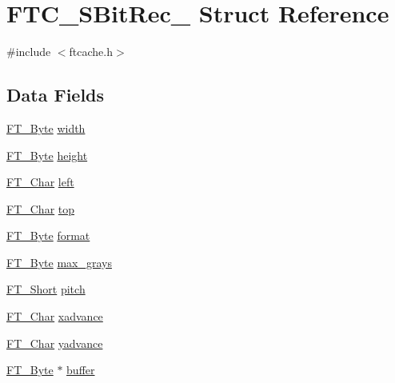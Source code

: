 \hypertarget{struct_f_t_c___s_bit_rec__}{}\section{F\+T\+C\+\_\+\+S\+Bit\+Rec\+\_\+ Struct Reference}
\label{struct_f_t_c___s_bit_rec__}


{\ttfamily \#include $<$ftcache.\+h$>$}

\subsection*{Data Fields}
\begin{DoxyCompactItemize}
\item 
\hyperlink{fttypes_8h_a51f26183ca0c9f4af958939648caeccd}{F\+T\+\_\+\+Byte} \hyperlink{struct_f_t_c___s_bit_rec___a5b92fb4f213a880f758bb87ac2ceb263}{width}
\item 
\hyperlink{fttypes_8h_a51f26183ca0c9f4af958939648caeccd}{F\+T\+\_\+\+Byte} \hyperlink{struct_f_t_c___s_bit_rec___a5953efe2aded3b184875d5e5d08cafef}{height}
\item 
\hyperlink{fttypes_8h_a0f851552b050883885f0a0855771f39d}{F\+T\+\_\+\+Char} \hyperlink{struct_f_t_c___s_bit_rec___aef273749f4fdb9943500ec6df8412a94}{left}
\item 
\hyperlink{fttypes_8h_a0f851552b050883885f0a0855771f39d}{F\+T\+\_\+\+Char} \hyperlink{struct_f_t_c___s_bit_rec___a3e558b3a04b70f00f80b862cdc94d9a2}{top}
\item 
\hyperlink{fttypes_8h_a51f26183ca0c9f4af958939648caeccd}{F\+T\+\_\+\+Byte} \hyperlink{struct_f_t_c___s_bit_rec___a3d3fcc2869ce5c95f0f63898e6cef8be}{format}
\item 
\hyperlink{fttypes_8h_a51f26183ca0c9f4af958939648caeccd}{F\+T\+\_\+\+Byte} \hyperlink{struct_f_t_c___s_bit_rec___a83958d4649a898312de9a7274550dff9}{max\+\_\+grays}
\item 
\hyperlink{fttypes_8h_aa7279be89046a2563cd3d4d6651fbdcf}{F\+T\+\_\+\+Short} \hyperlink{struct_f_t_c___s_bit_rec___a1382ec014df599e706c2c1785bc18235}{pitch}
\item 
\hyperlink{fttypes_8h_a0f851552b050883885f0a0855771f39d}{F\+T\+\_\+\+Char} \hyperlink{struct_f_t_c___s_bit_rec___a502a0bb69d973d2ae626a842eb9fefd3}{xadvance}
\item 
\hyperlink{fttypes_8h_a0f851552b050883885f0a0855771f39d}{F\+T\+\_\+\+Char} \hyperlink{struct_f_t_c___s_bit_rec___aabe767ddaf7ff62918886c6f62e9ac28}{yadvance}
\item 
\hyperlink{fttypes_8h_a51f26183ca0c9f4af958939648caeccd}{F\+T\+\_\+\+Byte} $\ast$ \hyperlink{struct_f_t_c___s_bit_rec___abe4d78fc3f411d67e7fc43f7aa21bd1d}{buffer}
\end{DoxyCompactItemize}



